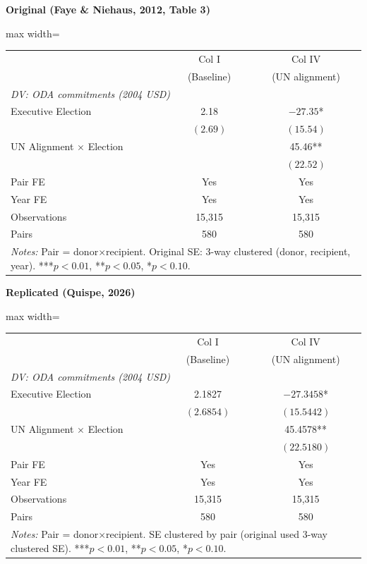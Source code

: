 \documentclass[11pt,a4paper]{article}
\begin{document}
\vspace{0.5cm}
\begin{minipage}[t]{0.48\textwidth}
\centering
\textbf{\large Original (Faye \& Niehaus, 2012, Table 3)}
\vspace{0.3cm}

\begin{adjustbox}{max width=\textwidth}
\begin{tabular}{lcc}
\toprule
 & Col I & Col IV \\
 & (Baseline) & (UN alignment) \\
\midrule
\multicolumn{3}{l}{\textit{DV: ODA commitments (2004 USD)}} \\
\addlinespace
Executive Election & 2.18 & $-27.35$* \\
 & $(2.69)$ & $(15.54)$ \\[0.3em]
UN Alignment $\times$ Election & & 45.46** \\
 & & $(22.52)$ \\[0.3em]
\midrule
Pair FE & Yes & Yes \\
Year FE & Yes & Yes \\
Observations & 15,315 & 15,315 \\
Pairs & 580 & 580 \\
\bottomrule
\multicolumn{3}{p{0.85\textwidth}}{\footnotesize\textit{Notes:} Pair = donor$\times$recipient. Original SE: 3-way clustered (donor, recipient, year). ***$p<0.01$, **$p<0.05$, *$p<0.10$.}
\end{tabular}
\end{adjustbox}
\end{minipage}%
\hfill
\begin{minipage}[t]{0.48\textwidth}
\centering
\textbf{\large Replicated (Quispe, 2026)}
\vspace{0.3cm}

\begin{adjustbox}{max width=\textwidth}
\begin{tabular}{lcc}
\toprule
 & Col I & Col IV \\
 & (Baseline) & (UN alignment) \\
\midrule
\multicolumn{3}{l}{\textit{DV: ODA commitments (2004 USD)}} \\
\addlinespace
Executive Election & 2.1827 & $-27.3458$* \\
 & $(2.6854)$ & $(15.5442)$ \\[0.3em]
UN Alignment $\times$ Election & & 45.4578** \\
 & & $(22.5180)$ \\[0.3em]
\midrule
Pair FE & Yes & Yes \\
Year FE & Yes & Yes \\
Observations & 15,315 & 15,315 \\
Pairs & 580 & 580 \\
\bottomrule
\multicolumn{3}{p{0.85\textwidth}}{\footnotesize\textit{Notes:} Pair = donor$\times$recipient. SE clustered by pair (original used 3-way clustered SE). ***$p<0.01$, **$p<0.05$, *$p<0.10$.}
\end{tabular}
\end{adjustbox}
\end{minipage}
\end{document}
